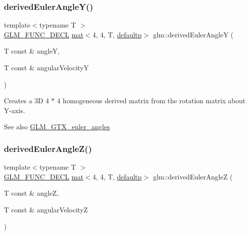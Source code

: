 \subsubsection{\texorpdfstring{derived\+Euler\+Angle\+Y()}{derivedEulerAngleY()}}
{\footnotesize\ttfamily template$<$typename T $>$ \\
\hyperlink{setup_8hpp_ab2d052de21a70539923e9bcbf6e83a51}{G\+L\+M\+\_\+\+F\+U\+N\+C\+\_\+\+D\+E\+CL} \hyperlink{structglm_1_1mat}{mat}$<$4, 4, T, \hyperlink{namespaceglm_a36ed105b07c7746804d7fdc7cc90ff25a9d21ccd8b5a009ec7eb7677befc3bf51}{defaultp}$>$ glm\+::derived\+Euler\+AngleY (\begin{DoxyParamCaption}\item[{T const \&}]{angleY,  }\item[{T const \&}]{angular\+VelocityY }\end{DoxyParamCaption})}

Creates a 3D 4 $\ast$ 4 homogeneous derived matrix from the rotation matrix about Y-\/axis. \begin{DoxySeeAlso}{See also}
\hyperlink{group__gtx__euler__angles}{G\+L\+M\+\_\+\+G\+T\+X\+\_\+euler\+\_\+angles} 
\end{DoxySeeAlso}
\mbox{\label{group__gtx__euler__angles_gae8b397348201c42667be983ba3f344df}} 
\subsubsection{\texorpdfstring{derived\+Euler\+Angle\+Z()}{derivedEulerAngleZ()}}
{\footnotesize\ttfamily template$<$typename T $>$ \\
\hyperlink{setup_8hpp_ab2d052de21a70539923e9bcbf6e83a51}{G\+L\+M\+\_\+\+F\+U\+N\+C\+\_\+\+D\+E\+CL} \hyperlink{structglm_1_1mat}{mat}$<$4, 4, T, \hyperlink{namespaceglm_a36ed105b07c7746804d7fdc7cc90ff25a9d21ccd8b5a009ec7eb7677befc3bf51}{defaultp}$>$ glm\+::derived\+Euler\+AngleZ (\begin{DoxyParamCaption}\item[{T const \&}]{angleZ,  }\item[{T const \&}]{angular\+VelocityZ }\end{DoxyParamCaption})}

